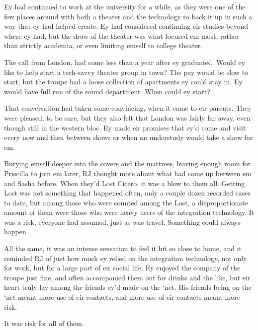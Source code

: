 Ey had continued to work at the university for a while, as they were one of the few places around with both a theater and the technology to back it up in such a way that ey had helped create.  Ey had considered continuing eir studies beyond where ey had, but the draw of the theater was what focused em most, rather than strictly academia, or even limiting emself to college theater.

The call from London, had come less than a year after ey graduated.  Would ey like to help start a tech-savvy theater group in town?  The pay would be slow to start, but the troupe had a loose collection of apartments ey could stay in.  Ey would have full run of the sound department.  When could ey start?

That conversation had taken some convincing, when it came to eir parents.  They were pleased, to be sure, but they also felt that London was fairly far away, even though still in the western bloc.  Ey made eir promises that ey'd come and visit every now and then between shows or when an understudy would take a show for em.

Burying emself deeper into the covers and the mattress, leaving enough room for Priscilla to join em later, RJ thought more about what had come up between em and Sasha before.  When they'd Lost Cicero, it was a blow to them all.  Getting Lost was not something that happened often, only a couple dozen recorded cases to date, but among those who were counted among the Lost, a disproportionate amount of them were those who were heavy users of the integration technology.  It was a risk, everyone had assumed, just as was travel.  Something could always happen.

All the same, it was an intense sensation to feel it hit so close to home, and it reminded RJ of just how much ey relied on the integration technology, not only for work, but for a large part of eir social life.  Ey enjoyed the company of the troupe just fine, and often accompanied them out for drinks and the like, but eir heart truly lay among the friends ey'd made on the `net.  His friends being on the `net meant more use of eir contacts, and more use of eir contacts meant more risk.

It was risk for all of them.
